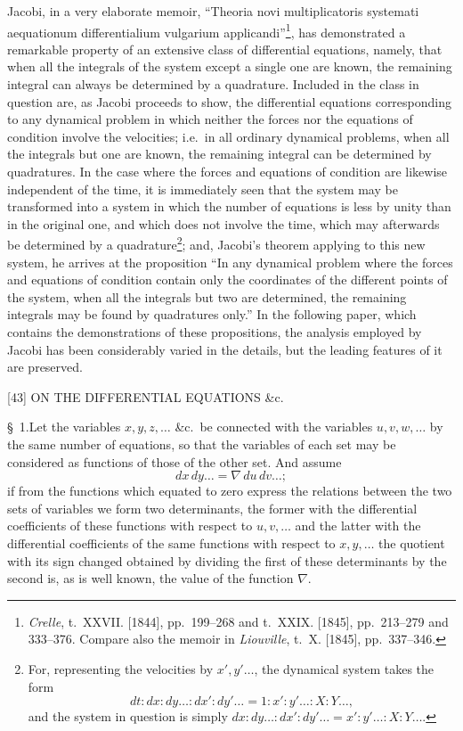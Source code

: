 \documentclass[11pt]{article}
\begin{document}
Jacobi, in a very elaborate memoir, ``Theoria novi multiplicatoris systemati aequationum differentialium vulgarium applicandi''\footnote{\textit{Crelle}, t.~XXVII. [1844], pp.~199--268 and t.~XXIX. [1845], pp.~213--279 and 333--376. Compare also the memoir in \textit{Liouville}, t.~X. [1845], pp.~337--346.}, has demonstrated a remarkable property of an extensive class of differential equations, namely, that when all the integrals of the system except a single one are known, the remaining integral can always be determined by a quadrature. Included in the class in question are, as Jacobi proceeds to show, the differential equations corresponding to any dynamical problem in which neither the forces nor the equations of condition involve the velocities; i.e.\ in all ordinary dynamical problems, when all the integrals but one are known, the remaining integral can be determined by quadratures. In the case where the forces and equations of condition are likewise independent of the time, it is immediately seen that the system may be transformed into a system in which the number of equations is less by unity than in the original one, and which does not involve the time, which may afterwards be determined by a quadrature\footnote{For, representing the velocities by $x', y'\dots$, the dynamical system takes the form
\[
  dt : dx : dy \dots : dx' : dy' \dots = 1 : x' : y' \dots : X : Y \dots,
\]
and the system in question is simply $dx : dy \dots : dx' : dy' \dots = x' : y' \dots : X : Y \dots$.}; and, Jacobi's theorem applying to this new system, he arrives at the proposition ``In any dynamical problem where the forces and equations of condition contain only the coordinates of the different points of the system, when all the integrals but two are determined, the remaining integrals may be found by quadratures only.'' In the following paper, which contains the demonstrations of these propositions, the analysis employed by Jacobi has been considerably varied in the details, but the leading features of it are preserved.

\vspace{2em}

\begin{center}\small [43] \quad ON THE DIFFERENTIAL EQUATIONS \&c. \end{center}

\noindent \S~1.\quad Let the variables $x, y, z, \dots$ \&c.\ be connected with the variables $u, v, w, \dots$ by the same number of equations, so that the variables of each set may be considered as functions of those of the other set. And assume
\[
  dx\,dy\dots = \nabla\,du\,dv\dots;
\]
if from the functions which equated to zero express the relations between the two sets of variables we form two determinants, the former with the differential coefficients of these functions with respect to $u, v, \dots$ and the latter with the differential coefficients of the same functions with respect to $x, y, \dots$ the quotient with its sign changed obtained by dividing the first of these determinants by the second is, as is well known, the value of the function $\nabla$.
\end{document}
